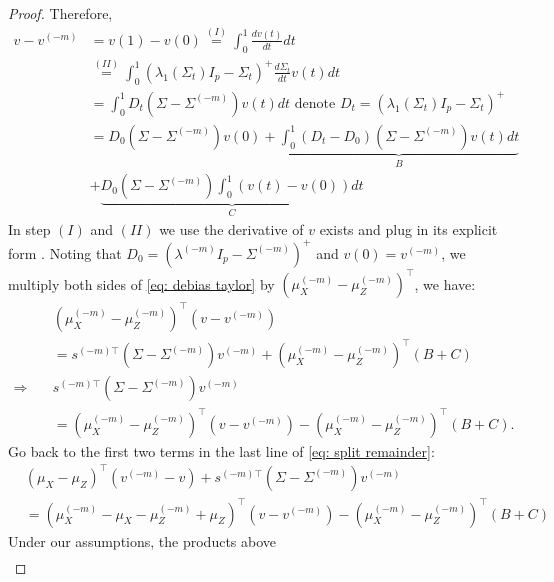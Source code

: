 \documentclass[11pt]{article}
\begin{document}
\begin{proof}
Therefore,
\begin{equation}
\label{eq: debias taylor}
\begin{aligned}
v-v^{(-m)}
& =v(1)-v(0)  \stackrel{(I)}{=}\int_0^1 \frac{d v(t)}{d t} d t \\
& \stackrel{(II)}{=} \int_0^1 (\lambda_1(\Sigma_t)I_p - \Sigma_t)^+ \frac{d \Sigma_t}{d t} v(t) d t \\
& =\int_0^1 D_t\left(\Sigma-\Sigma^{(-m)}\right) v(t) d t \text {  denote } D_t=\left(\lambda_1\left(\Sigma_t\right) I_p-\Sigma_t\right)^{+}\\
& = D_0(\Sigma-\Sigma^{(-m)}) v(0)+\underbrace{\int_0^1(D_t-D_0)(\Sigma-\Sigma^{(-m)}) v(t) d t}_{B} \\
& +\underbrace{D_0(\Sigma-\Sigma^{(-m)}) \int_0^1(v(t)-v(0)) d t}_{C}
\end{aligned}
\end{equation}
In step $(I)$ and $(II)$ we use the derivative of $v$ exists and plug in its explicit form \cite{magnus1985differentiating, critchley1985influence}. Noting that $D_0 = (\lambda^{(-m)} I_p - \Sigma^{(-m)})^+$ and $v(0) = v^{(-m)}$, we multiply both sides of \eqref{eq: debias taylor} by $\left(\mu_X^{(-m)}-\mu_Z^{(-m)}\right)^{\top}$, we have:
\begin{align*}
    & \left(\mu_X^{(-m)}-\mu_Z^{(-m)}\right)^{\top}\left(v-v^{(-m)}\right) \\
    & = s^{(-m)\top}\left(\Sigma-\Sigma^{(-m)}\right) v^{(-m)} + \left(\mu_X^{(-m)}-\mu_Z^{(-m)}\right)^{\top}(B+C)\\
\Rightarrow \quad& s^{(-m)\top}\left(\Sigma-\Sigma^{(-m)}\right) v^{(-m)}\\
& = \left(\mu_X^{(-m)}-\mu_Z^{(-m)}\right)^{\top}(v - v^{(-m)}) - \left(\mu_X^{(-m)}-\mu_Z^{(-m)}\right)^{\top}(B + C).
\end{align*}
Go back to the first two terms in the last line of \eqref{eq: split remainder}:
\begin{equation*}
\begin{aligned}
& \left(\mu_X-\mu_Z\right)^{\top}\left(v^{(-m)}-v\right) + s^{(-m)\top}\left(\Sigma-\Sigma^{(-m)}\right) v^{(-m)}\\
& = \left(\mu_X^{(-m)}-\mu_X-\mu_Z^{(-m)}+\mu_Z\right)^{\top}\left(v-v^{(-m)}\right)-\left(\mu_X^{(-m)}-\mu_Z^{(-m)}\right)^{\top}(B+C)
\end{aligned}
\end{equation*}
Under our assumptions, the products above
\begin{equation}\label{eq: demon trio}
\begin{aligned}

\end{aligned}
\end{equation}
\end{proof}
\end{document}
